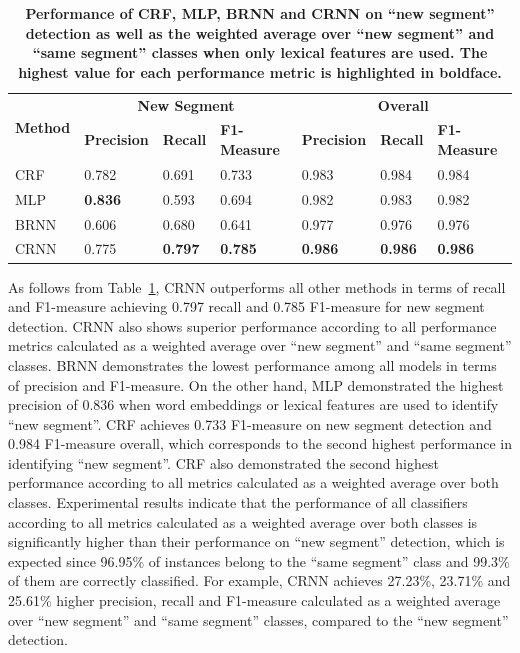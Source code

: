 \documentclass{amia}
\begin{document}
\begin{table}[ht]
\centering
\caption{\textbf{Performance of CRF, MLP, BRNN and CRNN on ``new segment'' detection as well as the weighted average over ``new segment'' and ``same segment'' classes when only lexical features are used. The highest value for each performance metric is highlighted in boldface.}}
\label{tab:result_base}
  \begin{tabular}{|l|l|l|l|l|l|l|}
  \hline
   \multirow{2}{*}{\textbf{Method}} & \multicolumn{3}{|c|}{\textbf{New Segment}} & \multicolumn{3}{|c|}{\textbf{Overall}} \\\cline{2-7}
   & \textbf{Precision}  & \textbf{Recall} & \textbf{F1-Measure} & \textbf{Precision}  & \textbf{Recall} & \textbf{F1-Measure} \\ \hline    
 CRF & 0.782 & 0.691 & 0.733 & 0.983 & 0.984 & 0.984 \\ \hline
 MLP & \textbf{0.836} & 0.593 & 0.694 & 0.982 & 0.983 & 0.982 \\ \hline
 BRNN & 0.606 & 0.680 & 0.641 & 0.977 & 0.976 & 0.976 \\ \hline
 CRNN & 0.775 & \textbf{0.797} & \textbf{0.785} & \textbf{0.986} & \textbf{0.986} & \textbf{0.986} \\ \hline
  \end{tabular}
\end{table}                              

As follows from Table~\ref{tab:result_base}, CRNN outperforms all other methods in terms of recall and F1-measure achieving 0.797 recall and 0.785 F1-measure for new segment detection. CRNN also shows superior performance according to all performance metrics calculated as a weighted average over ``new segment'' and ``same segment'' classes. BRNN demonstrates the lowest performance among all models in terms of precision and F1-measure. On the other hand, MLP demonstrated the highest precision of 0.836 when word embeddings or lexical features are used to identify ``new segment''. CRF achieves 0.733 F1-measure on new segment detection and 0.984 F1-measure overall, which corresponds to the second highest performance in identifying ``new segment''. CRF also demonstrated the second highest performance according to all metrics calculated as a weighted average over both classes. Experimental results indicate that the performance of all classifiers according to all metrics calculated as a weighted average over both classes is significantly higher than their performance on ``new segment'' detection, which is expected since 96.95\% of instances belong to the ``same segment'' class and 99.3\% of them are correctly classified. For example, CRNN achieves 27.23\%, 23.71\% and 25.61\% higher precision, recall and F1-measure calculated as a weighted average over ``new segment'' and ``same segment'' classes, compared to the ``new segment'' detection. \\
\end{document}
